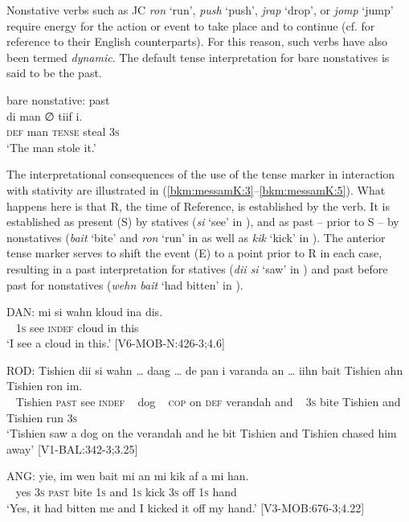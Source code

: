 \documentclass[output=paper,colorlinks,citecolor=brown]{langscibook}
\begin{document}
Nonstative verbs such as JC \textit{ron} ‘run’, \textit{push} ‘push’, \textit{jrap} ‘drop’, or \textit{jomp} ‘jump’ require energy for the action or event to take place and to continue (cf. \citealt[63]{andersen1990papiamentu} for reference to their English counterparts). For this reason, such verbs have also been termed \textit{dynamic}. The default tense interpretation for bare nonstatives is said to be the past.

\ea \label{bkm:messamK:2}bare nonstative: past \\
\gll di    man ∅  tiif    i.\\
\textsc{def} man \textsc{tense} steal 3\textsc{s}  \\
\glt ‘The man stole it.’
\z


The interpretational consequences of the use of the tense marker in interaction with stativity are illustrated in (\ref{bkm:messamK:3}--\ref{bkm:messamK:5}). What happens here is that R, the time of Reference, is established by the verb. It is established as present (S) by statives (\textit{si} ‘see’ in ), and as past -- prior to S -- by nonstatives (\textit{bait} ‘bite’ and \textit{ron} ‘run’ in  as well as \textit{kik} ‘kick’ in ). The anterior tense marker serves to shift the event (E) to a point prior to R in each case, resulting in a past interpretation for statives (\textit{dii si} ‘saw’ in ) and past before past for nonstatives (\textit{wehn bait} ‘had bitten’ in ).

\ea \label{bkm:messamK:3}
\gll   DAN:   mi   si   wahn   kloud   ina   dis.\\
~ 1\textsc{s}  see  \textsc{indef}  cloud  in  this\\
\glt  \hphantom{DAN:} `I see a cloud in this.’             [V6-MOB-N:426-3;4.6]
\z




\ea \label{bkm:messamK:4}
  \gll ROD: Tishien dii si wahn … daag … de pan i varanda  an … iihn bait Tishien ahn Tishien ron im.\\
~ Tishien  \textsc{past} see \textsc{indef} ~ dog ~ \textsc{cop} on \textsc{def} verandah and ~ 3\textsc{s} bite Tishien and Tishien run 3\textsc{s}  \\
\glt \hphantom{ROD:} `Tishien saw a dog on the verandah and he bit Tishien and Tishien chased him away’   [V1-BAL:342-3;3.25]
\z



\ea \label {bkm:messamK:5}
\gll   ANG:   yie, im   wen  bait mi  an   mi  kik  af  a mi han.\\
 ~ yes 3\textsc{s}  \textsc{past} bite 1\textsc{s}  and 1\textsc{s}   kick 3\textsc{s} off 1\textsc{s} hand\\
\glt \hphantom{ANG:}  `Yes, it had bitten me and I kicked it off my hand.’       [V3-MOB:676-3;4.22]
\z
\end{document}
